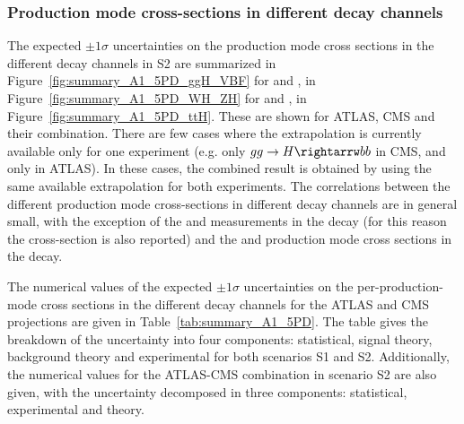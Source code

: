 \subsubsection{Production mode cross-sections in different decay channels}
\label{sec:expcomb_prodtimesdecay}
The expected $\pm 1\sigma$ uncertainties on the production mode cross sections in the different decay channels in S2 are summarized in Figure~\ref{fig:summary_A1_5PD_ggH_VBF} for \ggh and \vbf, in Figure~\ref{fig:summary_A1_5PD_WH_ZH} for \wh and \zh, in Figure~\ref{fig:summary_A1_5PD_ttH}. These are shown for ATLAS, CMS and their combination.
There are few cases where the extrapolation is currently available only for one experiment (e.g. only $gg \rightarrow H \rightarrw bb$ in CMS, and only \hzg in ATLAS). In these cases, the combined result is obtained by using the same available extrapolation  for both experiments.
The correlations between the different production mode cross-sections in different decay channels are in general small, with the exception of the \zh and \wh measurements in the \hzz decay (for this reason the \vh cross-section is also reported) and the \ggh and \vbf production mode cross sections in the \hmm decay. 


The numerical values of the expected $\pm 1\sigma$ uncertainties on the per-production-mode cross sections in the different decay channels for the ATLAS and CMS projections are given in Table~\ref{tab:summary_A1_5PD}. The table  gives the breakdown of the uncertainty into four components: statistical, signal theory, background theory and experimental for both scenarios S1 and S2. Additionally, the numerical values for the ATLAS-CMS combination in scenario S2 are also given, with the uncertainty decomposed in three components: statistical, experimental and theory.


